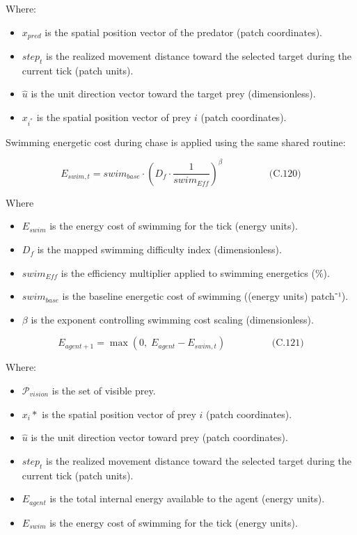 \documentclass[
]{book}
\providecommand{\tightlist}{%
  \setlength{\itemsep}{0pt}\setlength{\parskip}{0pt}}
\begin{document}
Where:

\begin{itemize}
\tightlist
\item
  \(x_{pred}\) is the spatial position vector of the predator (patch
  coordinates).
\item
  \(step_{t}\) is the realized movement distance toward the selected
  target during the current tick (patch units).
\item
  \(\hat{u}\) is the unit direction vector toward the target prey
  (dimensionless).
\item
  \(x_{i^*}\) is the spatial position vector of prey \(i\) (patch
  coordinates).
\end{itemize}

Swimming energetic cost during chase is applied using the same shared
routine:

\[
\begin{equation} E_{swim,t} = swim_{base} \cdot \left(D_f \cdot \frac{1}{swim_{Eff}}\right)^{\beta}  \hspace{2cm} \text{(C.120)} \end{equation}
\]

Where

\begin{itemize}
\tightlist
\item
  \(E_{swim}\) is the energy cost of swimming for the tick (energy
  units).
\item
  \(D_f\) is the mapped swimming difficulty index (dimensionless).
\item
  \(swim_{Eff}\) is the efficiency multiplier applied to swimming
  energetics (\%).
\item
  \(swim_{base}\) is the baseline energetic cost of swimming ((energy
  units) patch⁻¹).
\item
  \(\beta\) is the exponent controlling swimming cost scaling
  (dimensionless).
\end{itemize}

\[
\begin{equation} E_{agent+1} = \max(0,\; E_{agent} - E_{swim,t})  \hspace{2cm} \text{(C.121)} \end{equation}
\]

Where:

\begin{itemize}
\tightlist
\item
  \(\mathcal{P}_{vision}\) is the set of visible prey.
\item
  \(x_i*\) is the spatial position vector of prey \(i\) (patch
  coordinates).
\item
  \(\hat{u}\) is the unit direction vector toward prey (patch
  coordinates).
\item
  \(step_{t}\) is the realized movement distance toward the selected
  target during the current tick (patch units).
\item
  \(E_{agent}\) is the total internal energy available to the agent
  (energy units).
\item
  \(E_{swim}\) is the energy cost of swimming for the tick (energy
  units).
\end{itemize}
\end{document}
